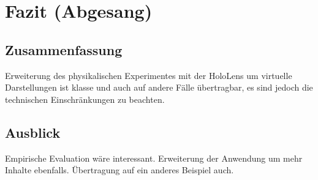 \section{Fazit (Abgesang)}
\label{sec-7}

\subsection{Zusammenfassung}
Erweiterung des physikalischen Experimentes mit der HoloLens um virtuelle Darstellungen ist klasse und auch auf andere Fälle übertragbar, es sind jedoch die technischen Einschränkungen zu beachten.

\subsection{Ausblick}
Empirische Evaluation wäre interessant. Erweiterung der Anwendung um mehr Inhalte ebenfalls. Übertragung auf ein anderes Beispiel auch.